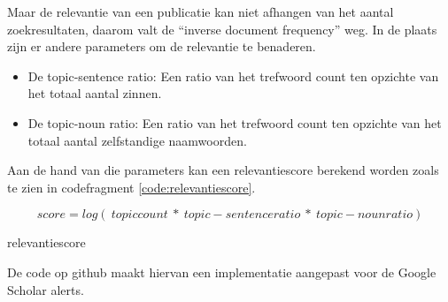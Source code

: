 Maar de relevantie van een publicatie kan niet afhangen van het aantal zoekresultaten, daarom valt de ``inverse document frequency'' weg. In de plaats zijn er andere parameters om de relevantie te benaderen.
\begin{itemize}
    \item De topic-sentence ratio: Een ratio van het trefwoord count ten opzichte van het totaal aantal zinnen.
    \item De topic-noun ratio: Een ratio van het trefwoord count ten opzichte van het totaal aantal zelfstandige naamwoorden.
\end{itemize}
Aan de hand van die parameters kan een relevantiescore berekend worden zoals te zien in codefragment \ref{code:relevantiescore}.
\begin{listing}
    \begin{equation}
        score=log\left(\ topic count\ \ast\ topic-sentence ratio\ \ast\ topic-noun ratio\right)
    \end{equation}  
    \caption[relevantiescore]{relevantiescore}
    \label{code:relevantiescore}
\end{listing}
De code op github \textcite{Depaepenlp2025} maakt hiervan een implementatie aangepast voor de Google Scholar alerts.
